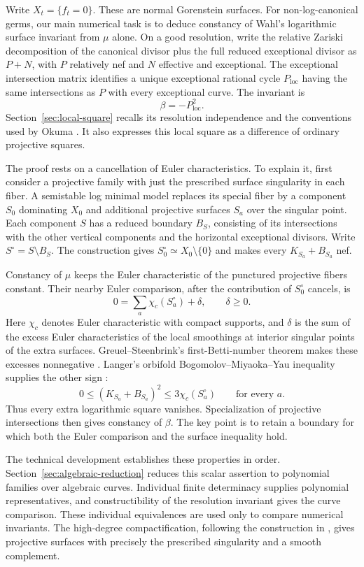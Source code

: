 Write $X_t=\{f_t=0\}$.  These are normal Gorenstein surfaces.  For
non-log-canonical germs, our main numerical task is to deduce constancy
of Wahl's logarithmic surface invariant from $\mu$ alone.
On a good resolution, write the relative Zariski decomposition of the
canonical divisor plus the full reduced exceptional divisor as $P+N$,
with $P$ relatively nef and $N$ effective and exceptional.  The
exceptional intersection matrix identifies a unique exceptional rational
cycle $P_{\mathrm{loc}}$ having the same intersections as $P$ with every
exceptional curve.  The invariant is
\[
 \beta=-P_{\mathrm{loc}}^2.
\]
Section~\ref{sec:local-square} recalls its resolution independence and
the conventions used by Okuma \cite[Section~2]{Okuma2004}.  It also
expresses this local square as a difference of ordinary projective
squares.

The proof rests on a cancellation of Euler characteristics.  To explain
it, first consider a projective family with just the prescribed surface
singularity in each fiber.  A semistable log minimal model replaces its
special fiber by a component $S_0$ dominating $X_0$ and additional
projective surfaces $S_a$ over the singular point.  Each component $S$
has a reduced boundary $B_S$, consisting of its intersections with the
other vertical components and the horizontal exceptional divisors.
Write $S^\circ=S\setminus B_S$.  The construction gives
$S_0^\circ\simeq X_0\setminus\{0\}$ and makes every
$K_{S_a}+B_{S_a}$ nef.

Constancy of $\mu$ keeps the Euler characteristic of the punctured
projective fibers constant.  Their nearby Euler comparison, after the
contribution of $S_0^\circ$ cancels, is
\[
 0=\sum_a\chi_c(S_a^\circ)+\delta,\qquad \delta\ge0.
\]
Here $\chi_c$ denotes Euler characteristic with compact supports, and
$\delta$ is the sum of the excess Euler characteristics of the local
smoothings at interior singular points of the extra surfaces.
Greuel--Steenbrink's first-Betti-number theorem makes these excesses
nonnegative \cite{GreuelSteenbrink1983}.
Langer's orbifold Bogomolov--Miyaoka--Yau inequality supplies the other
sign \cite{Langer2003}:
\[
 0\le (K_{S_a}+B_{S_a})^2\le3\chi_c(S_a^\circ)
 \qquad\text{for every }a.
\]
Thus every extra logarithmic square vanishes.  Specialization of
projective intersections then gives constancy of $\beta$.  The key
point is to retain a boundary for which both the Euler comparison and
the surface inequality hold.

The technical development establishes these properties in order.
Section~\ref{sec:algebraic-reduction} reduces this scalar assertion to
polynomial families over algebraic curves.  Individual finite
determinacy supplies polynomial representatives, and constructibility
of the resolution invariant gives the curve comparison.  These
individual equivalences are used only to compare numerical invariants.
The high-degree compactification, following the construction in
\cite[Lemma~2.5]{Steenbrink1985}, gives projective surfaces with precisely
the prescribed singularity and a smooth complement.

